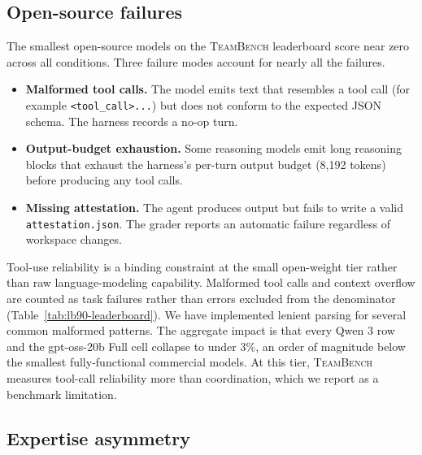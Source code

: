 \documentclass{article}
\begin{document}
\subsection{Open-source failures}
\label{app:open-source}

The smallest open-source models on the \textsc{TeamBench} leaderboard score near zero across all conditions. Three failure modes account for nearly all the failures.

\begin{itemize}[nosep]
\item \textbf{Malformed tool calls.} The model emits text that resembles a tool call (for example \texttt{<tool\_call>...}) but does not conform to the expected JSON schema. The harness records a no-op turn.
\item \textbf{Output-budget exhaustion.} Some reasoning models emit long reasoning blocks that exhaust the harness's per-turn output budget (8,192 tokens) before producing any tool calls.
\item \textbf{Missing attestation.} The agent produces output but fails to write a valid \texttt{attestation.json}. The grader reports an automatic failure regardless of workspace changes.
\end{itemize}

Tool-use reliability is a binding constraint at the small open-weight tier rather than raw language-modeling capability. Malformed tool calls and context overflow are counted as task failures rather than errors excluded from the denominator (Table~\ref{tab:lb90-leaderboard}). We have implemented lenient parsing for several common malformed patterns. The aggregate impact is that every Qwen 3 row and the gpt-oss-20b Full cell collapse to under $3\%$, an order of magnitude below the smallest fully-functional commercial models. At this tier, \textsc{TeamBench} measures tool-call reliability more than coordination, which we report as a benchmark limitation.

\subsection{Expertise asymmetry}
\label{app:ea-results}
\end{document}
